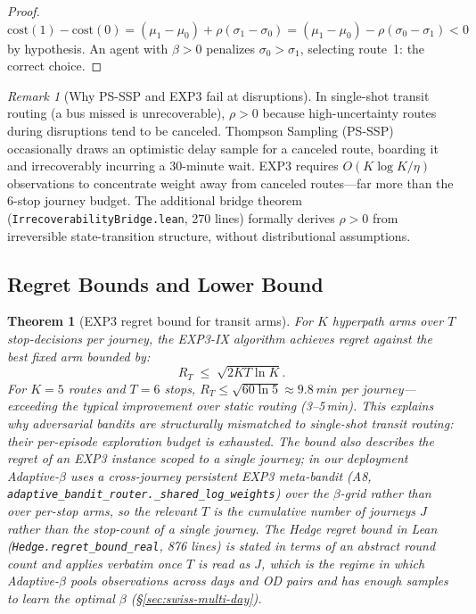 \documentclass[11pt]{article}
\newtheorem{theorem}{Theorem}
\theoremstyle{definition}
\theoremstyle{remark}
\newtheorem{remark}{Remark}
\begin{document}
\begin{proof}
$\mathrm{cost}(1) - \mathrm{cost}(0)
= (\mu_1 - \mu_0) + \rho(\sigma_1 - \sigma_0)
= (\mu_1 - \mu_0) - \rho(\sigma_0 - \sigma_1) < 0$
by hypothesis.
An agent with $\beta > 0$ penalizes $\sigma_0 > \sigma_1$,
selecting route~1: the correct choice.
\end{proof}

\begin{remark}[Why PS-SSP and EXP3 fail at disruptions]
In single-shot transit routing (a bus missed is unrecoverable),
$\rho > 0$ because high-uncertainty routes during disruptions
tend to be canceled.
Thompson Sampling (PS-SSP) occasionally draws an optimistic
delay sample for a canceled route, boarding it and irrecoverably
incurring a 30-minute wait.
EXP3 requires $O(K\log K/\eta)$ observations to concentrate
weight away from canceled routes---far more than the 6-stop
journey budget.
The additional bridge theorem (\texttt{IrrecoverabilityBridge.lean},
270 lines) formally derives $\rho > 0$ from irreversible
state-transition structure, without distributional assumptions.
\end{remark}

\subsection{Regret Bounds and Lower Bound}

\begin{theorem}[EXP3 regret bound for transit arms]\label{thm:exp3}
For $K$ hyperpath arms over $T$ stop-decisions per journey,
the EXP3-IX algorithm achieves regret against the best fixed arm bounded by:
\[
R_T \;\leq\; \sqrt{2KT\ln K}.
\]
For $K = 5$ routes and $T = 6$ stops, $R_T \leq \sqrt{60\ln 5} \approx 9.8$\,min
per journey---exceeding the typical improvement over static routing (3--5\,min).
This explains why adversarial bandits are structurally mismatched to
single-shot transit routing: their per-episode exploration budget is exhausted.
The bound also describes the regret of an EXP3 instance scoped to
\emph{a single journey}; in our deployment Adaptive-$\beta$ uses a
\emph{cross-journey persistent} EXP3 meta-bandit (A8,
\texttt{adaptive\_bandit\_router.\_shared\_log\_weights}) over the
$\beta$-grid rather than over per-stop arms, so the relevant $T$ is
the cumulative number of journeys $J$ rather than the stop-count of
a single journey. The Hedge regret bound in Lean
(\texttt{Hedge.regret\_bound\_real}, 876 lines) is stated in terms
of an abstract round count and applies verbatim once $T$ is read as
$J$, which is the regime in which Adaptive-$\beta$ pools observations
across days and OD pairs and has enough samples to learn the optimal
$\beta$ (\S\ref{sec:swiss-multi-day}).
\end{theorem}
\end{document}
